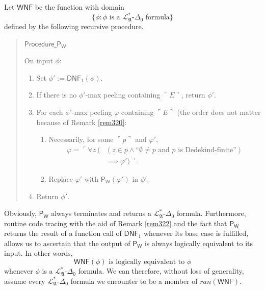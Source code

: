 \documentclass[12pt]{article}
\numberwithin{equation}{section}
\begin{document}
Let $\mathsf{WNF}$ be the function with domain
\begin{equation*}
    \{\phi: \phi \text{ is a } \mathcal{L}^{*}_{\mathfrak{A}}\text{-}\Delta_0 \text{ formula}\} 
\end{equation*} 
defined by the following recursive procedure.

\begin{quote}
    \underline{$\mathsf{Procedure}$ $\mathsf{P_W}$}

    On input $\phi$:
    \begin{enumerate}[label=(\arabic*)]
        \item Set $\phi' := \mathsf{DNF}_1(\phi)$.
        \item If there is no $\phi'$-max peeling containing $\ulcorner E \urcorner$, return $\phi'$.
        \item For each $\phi'$-max peeling $\varphi$ containing $\ulcorner E \urcorner$ (the order does not matter because of Remark \ref{rem320}:
        \begin{enumerate}[label=(F\arabic*), leftmargin=30pt]
            \item Necessarily, for some $\ulcorner p \urcorner$ and $\varphi'$,
                \begin{align*}
                    \varphi = \ulcorner \forall z \ ( & (z \in p \wedge \text{``}\emptyset \neq p \text{ and } p \text{ is Dedekind-finite''}) \\
                    & \implies \varphi') \urcorner \text{.}
                \end{align*}
            \item Replace $\varphi'$ with $\mathsf{P_W}(\varphi')$ in $\phi'$.
        \end{enumerate}
        \item Return $\phi'$.
    \end{enumerate}
\end{quote}

\begin{rem}\label{rem321}
Obviously, $\mathsf{P_W}$ always terminates and returns a $\mathcal{L}^{*}_{\mathfrak{A}}$-$\Delta_0$ formula. Furthermore, routine code tracing with the aid of Remark \ref{rem322} and the fact that $\mathsf{P_W}$ returns the result of a function call of $\mathsf{DNF}_1$ whenever its base case is fulfilled, allows us to ascertain that the output of $\mathsf{P_W}$ is always logically equivalent to its input. In other words, 
\begin{equation*}
    \mathsf{WNF}(\phi) \text{ is logically equivalent to } \phi
\end{equation*}
whenever $\phi$ is a $\mathcal{L}^{*}_{\mathfrak{A}}$-$\Delta_0$ formula. We can therefore, without loss of generality, assume every $\mathcal{L}^{*}_{\mathfrak{A}}$-$\Delta_0$ formula we encounter to be a member of $ran(\mathsf{WNF})$.
\end{rem}
\end{document}
